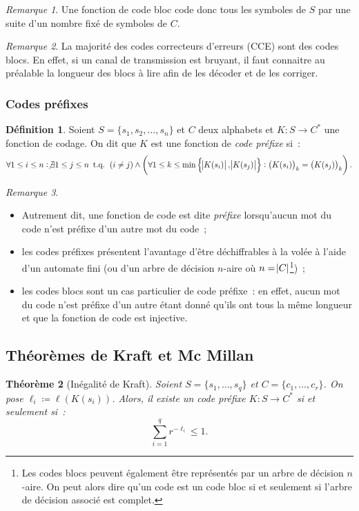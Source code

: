\documentclass{article}
\DeclareMathOperator{\tq}{\text{ t.q. }}
\newtheorem{thm}{Théorème}[section]
\theoremstyle{definition}
\newtheorem{déf}[thm]{Définition}
\theoremstyle{remark}
\newtheorem*{rmq}{Remarque}
\begin{document}
			\begin{rmq} Une fonction de code bloc code donc tous les symboles de $S$ par une suite d'un nombre fixé de symboles de $C$. \end{rmq}

			\begin{rmq} La majorité des codes correcteurs d'erreurs (CCE) sont des codes blocs. En effet, si un canal de transmission est bruyant, il faut
			connaitre au préalable la longueur des blocs à lire afin de les décoder et de les corriger. \end{rmq}

		\subsubsection{Codes préfixes}
			\begin{déf} Soient $S = \{s_1, s_2, \ldots, s_n\}$ et $C$ deux alphabets et $K : S \to C^*$ une fonction de codage. On dit que $K$ est une
			fonction de \textit{code préfixe} si~:
			\[\forall 1 \leq i \leq n : \not \exists 1 \leq j \leq n \tq \left(i \neq j\right) \land
				\left(\forall 1 \leq k \leq \min\left\{\abs {K(s_i)}, \abs{K(s_j)}\right\} : \left(K(s_i)\right)_k = \left(K(s_j)\right)_k\right).\]
			\end{déf}

			\begin{rmq}~
			\begin{itemize}
				\item Autrement dit, une fonction de code est dite \textit{préfixe} lorsqu'aucun mot du code n'est préfixe d'un autre mot du code~;
				\item les codes préfixes présentent l'avantage d'être déchiffrables à la volée à l'aide d'un automate fini
				      (ou d'un arbre de décision $n$-aire où $n = \abs C$\footnote{Les codes blocs peuvent également être représentés par un arbre de
				      décision $n$-aire. On peut alors dire qu'un code est un code bloc si et seulement si l'arbre de décision associé est complet.})~;
				\item les codes blocs sont un cas particulier de code préfixe~: en effet, aucun mot du code n'est préfixe d'un autre étant donné qu'ils
				      ont tous la même longueur et que la fonction de code est injective.
			\end{itemize}
			\end{rmq}

	\subsection{Théorèmes de Kraft et Mc Millan}
		\begin{thm}[Inégalité de Kraft] Soient $S = \{s_1, \ldots, s_q\}$ et $C = \{c_1, \ldots, c_r\}$. On pose $\ell_i \coloneqq \ell(K(s_i))$.
		Alors, il existe un code préfixe $K : S \to C^*$ si et seulement si~:
		\[\sum_{i=1}^qr^{-\ell_i} \leq 1.\]
		\end{thm}
\end{document}
